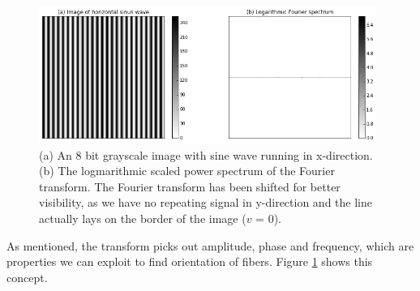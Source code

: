 \begin{figure}[h]
\centering
\includegraphics[width=11cm]{ft_demo.png}
\caption{(a) An 8 bit grayscale image with sine wave running in x-direction. (b) The logmarithmic scaled power spectrum of the Fourier transform. The Fourier transform has been shifted for better visibility, as we have no repeating signal in y-direction and the line actually lays on the border of the image ($v$ = 0).}
\label{fig:ft_demo}
\end{figure}

As mentioned, the transform picks out amplitude, phase and frequency, which are properties we can exploit to find orientation of fibers. Figure \ref{fig:ft_demo} shows this concept.


%
%







